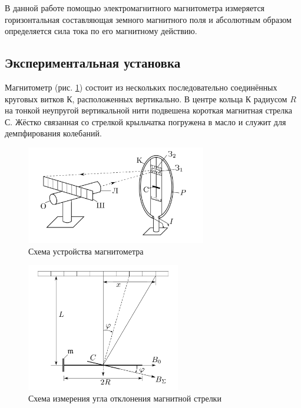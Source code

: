 \documentclass[a4paper,12pt]{article} %
\begin{document}
В данной работе помощью электромагнитного магнитометра измеряется горизонтальная составляющая земного магнитного поля и абсолютным образом определяется сила тока по его магнитному действию.

\subsection{Экспериментальная установка}

Магнитометр (рис. \ref{fig:setup}) состоит из нескольких последовательно соединённых круговых витков К, расположенных вертикально. В центре кольца К радиусом $R$ на тонкой неупругой вертикальной нити подвешена короткая магнитная стрелка С. Жёстко связанная со стрелкой крыльчатка погружена в масло и служит для демпфирования колебаний.

\begin{figure}[h!]
\begin{center}
    \includegraphics[width=0.7\textwidth]{setup.png}
\end{center}
\caption{Схема устройства магнитометра}
\label{fig:setup}
\end{figure}

\begin{figure}[h!]
\begin{center}
    \includegraphics[width=0.6\textwidth]{measurement.png}
\end{center}
\caption{Схема измерения угла отклонения магнитной стрелки}
\label{fig:measurement}
\end{figure}
\end{document}
